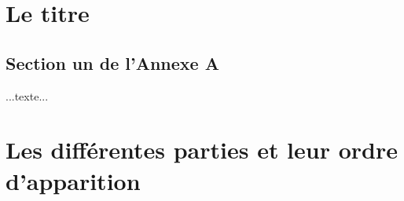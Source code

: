 \documentclass[12pt,twoside,maitrise]{dms_ks}
\theoremstyle{definition}
\begin{document}




\printbibliography


\appendix
\chapter{Le titre}

\section{Section un de l'Annexe A}

...texte...

\chapter{Les différentes parties et leur ordre d'apparition}
\end{document}

